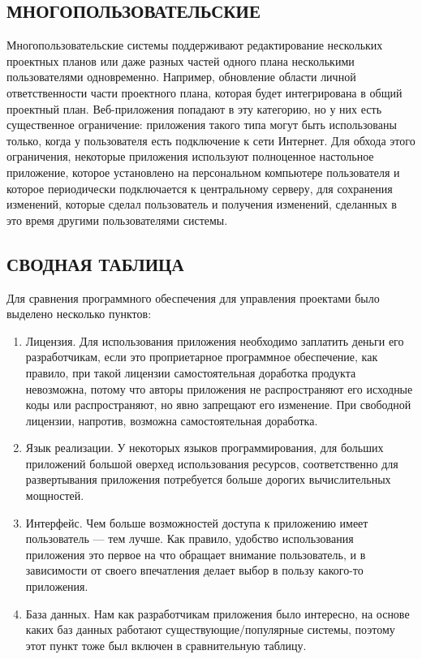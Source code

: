 \documentclass[14pt, a4paper]{extreport}
\begin{document}
\subsection{\MakeTextUppercase{Многопользовательские}}
Многопользовательские системы поддерживают редактирование нескольких проектных
планов или даже разных частей одного плана несколькими пользователями одновременно.
Например, обновление области личной ответственности части проектного плана, которая
будет интегрирована в общий проектный план. Веб-приложения попадают в эту категорию,
но у них есть существенное ограничение: приложения такого типа могут быть использованы
только, когда у пользователя есть подключение к сети Интернет. Для обхода этого
ограничения, некоторые приложения используют полноценное настольное приложение, которое
установлено на персональном компьютере пользователя и которое периодически подключается
к центральному серверу, для сохранения изменений, которые сделал пользователь и получения
изменений, сделанных в это время другими пользователями системы.

\subsection{\MakeTextUppercase{Сводная таблица}}
Для сравнения программного обеспечения для управления проектами было выделено
несколько пунктов:
\begin{enumerate}
\item Лицензия. Для использования приложения необходимо заплатить деньги
  его разработчикам, если это проприетарное программное обеспечение, как правило,
  при такой лицензии самостоятельная доработка продукта невозможна, потому
  что авторы приложения не распространяют его исходные коды или распространяют, но
  явно запрещают его изменение. При свободной лицензии,
  напротив, возможна самостоятельная доработка.
\item Язык реализации. У некоторых языков программирования, для больших приложений
  большой оверхед использования ресурсов, соответственно для развертывания приложения
  потребуется больше дорогих вычислительных мощностей.
\item Интерфейс. Чем больше возможностей доступа к приложению имеет пользователь --- тем лучше.
  Как правило, удобство использования приложения это первое на что обращает внимание пользователь,
  и в зависимости от своего впечатления делает выбор в пользу какого-то приложения.
\item База данных. Нам как разработчикам приложения было интересно, на основе каких баз данных
  работают существующие/популярные системы, поэтому этот пункт тоже был включен в сравнительную таблицу.
\end{enumerate}
\end{document}

